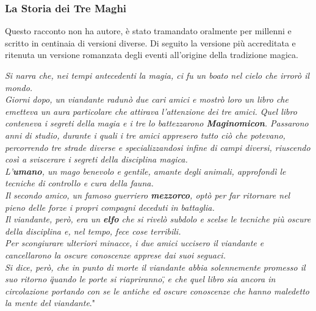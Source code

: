 \documentclass[10pt,twoside,onecolumn,openany]{book}
\begin{document}
\subsubsection{La Storia dei Tre Maghi}
Questo racconto non ha autore, è stato tramandato oralmente per millenni e scritto in centinaia di versioni diverse. Di seguito la versione più accreditata e ritenuta un versione romanzata degli eventi all'origine della tradizione magica.\\
\begin{quotebox}
\textit{Si narra che, nei tempi antecedenti la magia, ci fu un boato nel cielo che irrorò il mondo.\\
Giorni dopo, un viandante radunò due cari amici e mostrò loro un libro che emetteva un aura particolare che attirava l'attenzione dei tre amici. Quel libro conteneva i segreti della magia e i tre lo battezzarono \textbf{Maginomicon}. Passarono anni di studio, durante i quali i tre amici appresero tutto ciò che potevano, percorrendo tre strade diverse e specializzandosi infine di campi diversi, riuscendo così a sviscerare i segreti della disciplina magica.\\
L'\textbf{umano}, un mago benevolo e gentile, amante degli animali, approfondì le tecniche di controllo e cura della fauna.\\
Il secondo amico, un famoso guerriero \textbf{mezzorco}, optò per far ritornare nel pieno delle forze i propri compagni deceduti in battaglia.\\
Il viandante, però, era un \textbf{elfo} che si rivelò subdolo e scelse le tecniche più oscure della disciplina e, nel tempo, fece cose terribili.\\
Per scongiurare ulteriori minacce, i due amici uccisero il viandante e cancellarono la oscure conoscenze apprese dai suoi seguaci.\\
Si dice, però, che in punto di morte il viandante abbia solennemente promesso il suo ritorno \"quando le porte si riapriranno\", e che quel libro sia ancora in circolazione portando con se le antiche ed oscure conoscenze che hanno maledetto la mente del viandante}."
\end{quotebox}
\end{document}
